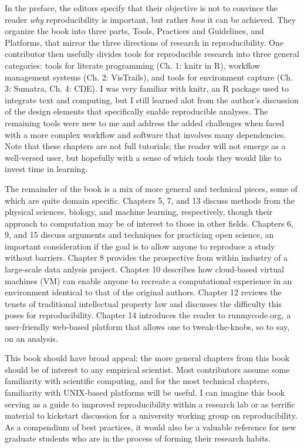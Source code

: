 \documentclass[12pt]{article}
\begin{document}
In the preface, the editors specify that their objective is not to convince the
reader \emph{why} reproducibility is important, but rather \emph{how} it can 
be achieved. They organize the book into three parts, Tools, Practices and 
Guidelines, and Platforms, that mirror the three directions of research in 
reproducibility. One contributor then usefully divides tools for reproducible research into three 
general categories: tools for literate programming (Ch. 1: knitr in R), workflow management 
systems (Ch. 2: VisTrails), and tools for environment capture (Ch. 3: Sumatra, Ch. 4: CDE). 
I was very familiar with knitr, an R package used to integrate text and computing,
but I still learned alot from the author's discussion of the design elements that
specifically enable reproducible analyses. The remaining tools were new to me and address
the added challenges when faced with a more complex workflow and software that
involves many dependencies. Note that these chapters are not full
tutorials; the reader will not emerge as a well-versed user, but hopefully with a 
sense of which tools they would like to invest time in learning.

The remainder of the book is a mix of more general and technical pieces,
some of which are quite domain specific.  Chapters 5, 7, and 13 discuss methods
from the physical sciences, biology, and machine learning, respectively, though
their approach to computation may be of interest to those in other fields. Chapters 
6, 9, and 15 discuss arguments and techniques for practicing open science, an
important consideration if the goal is to allow anyone to reproduce a study
without barriers.  Chapter 8 provides the prospective from within industry of a 
large-scale data anlysis project. Chapter 10 describes how cloud-based virtual 
machines (VM) can enable anyone to recreate a computational experience in an 
environment identical to that of the original authors. Chapter 12 reviews the
tenets of traditional intellectual property law and discusses the difficulty
 this poses for reproducibility. Chapter 14 introduces the reader to runmycode.org,
a user-friendly web-based platform that allows one to tweak-the-knobs, so to say,
on an analysis.

This book should have broad appeal; the more general chapters 
from this book should be of interest to any empirical scientist. Most contributors
assume some familiarity with scientific computing, and for the most technical 
chapters, familiarity with UNIX-based platforms will be useful. I can imagine this book serving as
a guide to improved reproducibility within a research lab or as terrific  
material to kickstart discussion for a university working group on reproducibility.  As a
compendium of best practices, it would also be a valuable reference for new graduate
students who are in the process of forming their research habits.
\end{document}
